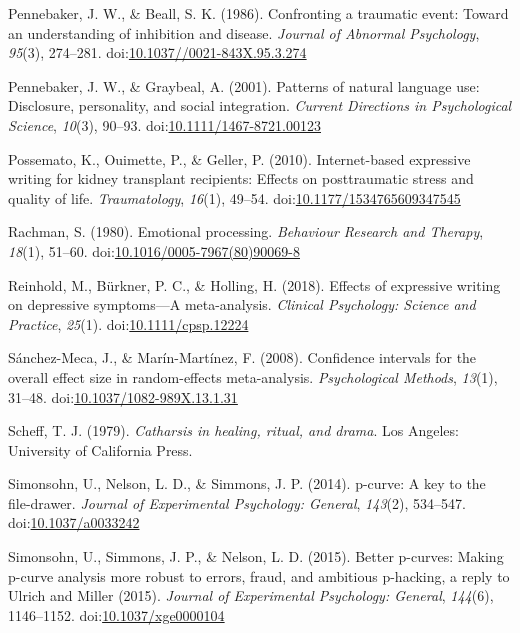 \documentclass[man]{apa6}
\theoremstyle{definition}
\theoremstyle{definition}
\theoremstyle{definition}
\theoremstyle{remark}
\begin{document}
\hypertarget{ref-Pennebaker1986}{}
Pennebaker, J. W., \& Beall, S. K. (1986). Confronting a traumatic
event: Toward an understanding of inhibition and disease. \emph{Journal
of Abnormal Psychology}, \emph{95}(3), 274--281.
doi:\href{https://doi.org/10.1037//0021-843X.95.3.274}{10.1037//0021-843X.95.3.274}

\hypertarget{ref-Pennebaker2001}{}
Pennebaker, J. W., \& Graybeal, A. (2001). Patterns of natural language
use: Disclosure, personality, and social integration. \emph{Current
Directions in Psychological Science}, \emph{10}(3), 90--93.
doi:\href{https://doi.org/10.1111/1467-8721.00123}{10.1111/1467-8721.00123}

\hypertarget{ref-Possemato2010}{}
Possemato, K., Ouimette, P., \& Geller, P. (2010). Internet-based
expressive writing for kidney transplant recipients: Effects on
posttraumatic stress and quality of life. \emph{Traumatology},
\emph{16}(1), 49--54.
doi:\href{https://doi.org/10.1177/1534765609347545}{10.1177/1534765609347545}

\hypertarget{ref-Rachman1980}{}
Rachman, S. (1980). Emotional processing. \emph{Behaviour Research and
Therapy}, \emph{18}(1), 51--60.
doi:\href{https://doi.org/10.1016/0005-7967(80)90069-8}{10.1016/0005-7967(80)90069-8}

\hypertarget{ref-Reinhold2018}{}
Reinhold, M., Bürkner, P. C., \& Holling, H. (2018). Effects of
expressive writing on depressive symptoms---A meta-analysis.
\emph{Clinical Psychology: Science and Practice}, \emph{25}(1).
doi:\href{https://doi.org/10.1111/cpsp.12224}{10.1111/cpsp.12224}

\hypertarget{ref-Sanchez-Meca2008a}{}
Sánchez-Meca, J., \& Marín-Martínez, F. (2008). Confidence intervals for
the overall effect size in random-effects meta-analysis.
\emph{Psychological Methods}, \emph{13}(1), 31--48.
doi:\href{https://doi.org/10.1037/1082-989X.13.1.31}{10.1037/1082-989X.13.1.31}

\hypertarget{ref-Scheff1979}{}
Scheff, T. J. (1979). \emph{Catharsis in healing, ritual, and drama}.
Los Angeles: University of California Press.

\hypertarget{ref-Simonsohn2014}{}
Simonsohn, U., Nelson, L. D., \& Simmons, J. P. (2014). p-curve: A key
to the file-drawer. \emph{Journal of Experimental Psychology: General},
\emph{143}(2), 534--547.
doi:\href{https://doi.org/10.1037/a0033242}{10.1037/a0033242}

\hypertarget{ref-Simonsohn2015}{}
Simonsohn, U., Simmons, J. P., \& Nelson, L. D. (2015). Better p-curves:
Making p-curve analysis more robust to errors, fraud, and ambitious
p-hacking, a reply to Ulrich and Miller (2015). \emph{Journal of
Experimental Psychology: General}, \emph{144}(6), 1146--1152.
doi:\href{https://doi.org/10.1037/xge0000104}{10.1037/xge0000104}
\end{document}
